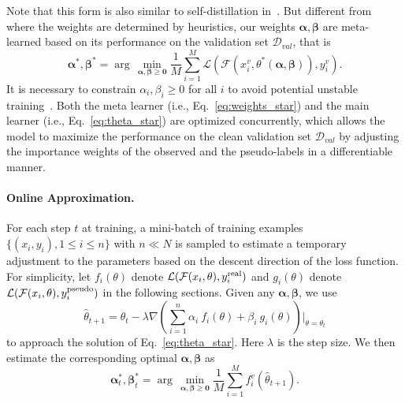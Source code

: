 \documentclass{article}
\newcommand{\argmin}{\arg\,\min}
\begin{document}
Note that this form is also similar to self-distillation in~\cite{li2017learning}. But different from~\cite{li2017learning} where the weights are determined by heuristics, our weights $\boldsymbol{\alpha}, \boldsymbol{\beta}$ are meta-learned based on its performance on the validation set $\mathcal{D}_{val}$, that is
\begin{equation}\label{eq:weights_star}
\boldsymbol{\alpha}^*, \boldsymbol{\beta}^* = \argmin_{\boldsymbol{\alpha}, \boldsymbol{\beta} \ge \boldsymbol{0}}\frac{1}{M} \sum_{i=1}^M\mathcal{L}(\mathcal{F} (x_i^v,\theta^*(\boldsymbol{\alpha}, \boldsymbol{\beta})), y_i^v).
\end{equation}
It is necessary to constrain $\alpha_i, \beta_i \ge 0$ for all $i$ to avoid potential unstable training~\cite{ren2018learning}.
Both the meta learner (i.e., Eq.~\eqref{eq:weights_star}) and the main learner (i.e., Eq.~\eqref{eq:theta_star}) are optimized concurrently, which allows the model to maximize the performance on the clean validation set $\mathcal{D}_{val}$ by adjusting the importance weights of the observed and the pseudo-labels in a differentiable manner.


\paragraph{Online Approximation.}
For each step $t$ at training, a mini-batch of training examples $\{(x_i,y_i),1\leq i\leq n\} $ with $n \ll N$ is sampled to estimate a temporary adjustment to the parameters based on the descent direction of the loss function. 
For simplicity, let $f_{i}(\theta)$ denote $\mathcal{L}(\mathcal{F} (x_i,\theta), y_i^\textup{real})$ and $g_{i}(\theta)$ denote $\mathcal{L}(\mathcal{F} (x_i,\theta), y_i^\textup{pseudo})$ in the following sections.
Given any $\boldsymbol{\alpha},\boldsymbol{\beta}$, we use 
\begin{equation}\label{eq:theta_hat}
\hat{\theta}_{t+1} = \theta_t - \lambda \nabla (\sum_{i=1}^n \alpha_i \ f_{i}(\theta)+\beta_i\ g_{i}(\theta))\Big |_{\theta=\theta_t}
\end{equation}
to approach the solution of Eq.~\eqref{eq:theta_star}. Here $\lambda$ is the step size. We then estimate the corresponding optimal $\boldsymbol{\alpha},\boldsymbol{\beta}$ as
\begin{equation}\label{eq:alpha_t}
\boldsymbol{\alpha}_t^*, \boldsymbol{\beta}_t^* = \argmin_{\boldsymbol{\alpha}, \boldsymbol{\beta} \ge \boldsymbol{0}}\frac{1}{M} \sum_{i=1}^M f_i^v(\hat{\theta}_{t+1}).
\end{equation}
\end{document}
